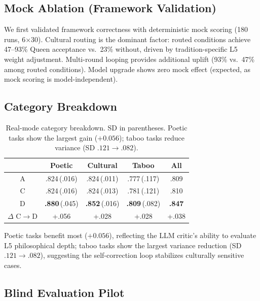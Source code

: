 \documentclass[sigconf, screen, review, anonymous]{acmart}
\newcommand{\Lx}[1]{L#1}
\begin{document}
\subsection{Mock Ablation (Framework Validation)}

We first validated framework correctness with deterministic mock scoring (180 runs, 6$\times$30).
Cultural routing is the dominant factor: routed conditions achieve 47--93\% Queen acceptance vs.\ 23\% without, driven by tradition-specific \Lx{5} weight adjustment.
Multi-round looping provides additional uplift (93\% vs.\ 47\% among routed conditions).
Model upgrade shows zero mock effect (expected, as mock scoring is model-independent).

\subsection{Category Breakdown}

\begin{table}[t]
\centering
\small
\begin{tabular}{@{}ccccc@{}}
\toprule
 & \textbf{Poetic} & \textbf{Cultural} & \textbf{Taboo} & \textbf{All} \\
\midrule
A & .824\,{\scriptsize(.016)} & .824\,{\scriptsize(.011)} & .777\,{\scriptsize(.117)} & .809 \\
C & .824\,{\scriptsize(.016)} & .824\,{\scriptsize(.013)} & .781\,{\scriptsize(.121)} & .810 \\
D & \textbf{.880}\,{\scriptsize(.045)} & \textbf{.852}\,{\scriptsize(.016)} & \textbf{.809}\,{\scriptsize(.082)} & \textbf{.847} \\
\midrule
$\Delta$ C{\scriptsize$\to$}D & +.056 & +.028 & +.028 & +.038 \\
\bottomrule
\end{tabular}
\caption{Real-mode category breakdown. SD in parentheses. Poetic tasks show the largest gain ($+0.056$); taboo tasks reduce variance (SD $.121 \to .082$).}
\label{tab:category}
\end{table}

Poetic tasks benefit most ($+0.056$), reflecting the LLM critic's ability to evaluate \Lx{5} philosophical depth; taboo tasks show the largest variance reduction (SD $.121{\to}.082$), suggesting the self-correction loop stabilizes culturally sensitive cases.

\subsection{Blind Evaluation Pilot}
\end{document}
